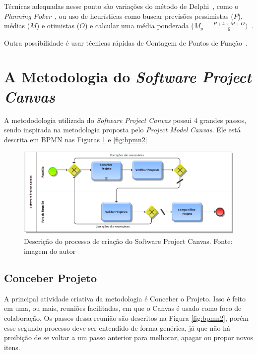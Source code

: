 \documentclass[a4]{report}
\begin{document}
Técnicas adequadas nesse ponto são variações do método de Delphi~\citep{delphi:1966}, como o \textit{Planning Poker}~\citep{mike:agile:estimating}, ou uso de heurísticas como buscar previsões pessimistas ($P$), médias ($M$) e otimistas ($O$) e calcular uma média ponderada ($M_p=\frac{P+4\times M+O}{6})$~\citep{pmbok:6}.

Outra possibilidade é usar técnicas rápidas de Contagem de Pontos de Função~\citep{ifpug:FPM:431}.

\section{A Metodologia do \textit{Software Project Canvas}}

A metododologia utilizada do \textit{Software Project Canvas} possui 4 grandes passos, sendo inspirada na metodologia proposta pelo \textit{Project Model Canvas}. Ele está descrita em BPMN nas Figuras \ref{fig:bpmn1} e \ref{fig:bpmn2}

\begin{figure}[htb]
    \centering
    \includegraphics[width=\textwidth]{imagens/Software Project Canvas - 4 pessos.adf.png}
    \caption{Descrição do processo de criação do Software Project Canvas. Fonte: imagem do autor}
    \label{fig:bpmn1}
\end{figure}

\subsection{Conceber Projeto}

A principal atividade criativa da metodologia é Conceber o Projeto. Isso é feito em uma, ou mais, reuniões facilitadas, em que o Canvas é usado como foco de colaboração. Os passos dessa reunião são descritos na Figura \ref{fig:bpmn2}, porém esse segundo processo deve ser entendido de forma genérica, já que não há proibição de se voltar a um passo anterior para melhorar, apagar ou propor novos itens.
\end{document}
